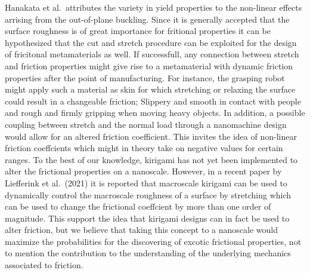 

Hanakata et al.\ attributes the variety in yield properties to the non-linear
effects arrising from the out-of-plane buckling. Since it is generally accepted
that the surface roughness is of great importance for fritional properties it
can be hypothesized that the cut and stretch procedure can be exploited for the
design of fricitonal metamaterials as well. If successfull, any connection
between stretch and friction properties might give rise to a metamaterial with
dynamic friction properties after the point of manufacturing. For instance, the
grasping robot might apply such a material as skin for which stretching or
relaxing the surface could result in a changeable friction; Slippery and smooth
in contact with people and rough and firmly gripping when moving heavy objects.
In addition, a possible coupling between stretch and the normal load through a
nanomachine design would allow for an altered friction coefficient. This invites
the idea of non-linear friction coeffcients which might in theory take on
negative values for certain ranges. To the best of our knowledge, kirigami has
not yet been implemented to alter the frictional properties on a nanoscale.
However, in a recent paper by Liefferink et al.\
\cite{LIEFFERINK2021101475}(2021) it is reported that macroscale kirigami can be
used to dynamically control the macroscale roughness of a surface by stretching
which can be used to change the frictional coeffcient by more than one order of
magnitude. This support the idea that kirigami designs can in fact be used to
alter friction, but we believe that taking this concept to a nanoscale would
maximize the probabilities for the discovering of excotic frictional properties,
not to mention the contribution to the understanding of the underlying mechanics
associated to friction. 














